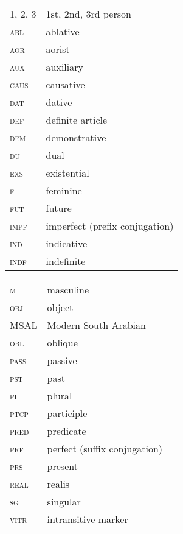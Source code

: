\documentclass[output=paper]{langsci/langscibook}
\begin{document}
\begin{tabularx}{.45\textwidth}{lQ}
\textsc{1, 2, 3} & 1st, 2nd, 3rd person \\
\textsc{abl} & ablative \\
\textsc{aor} & aorist \\
\textsc{aux} & auxiliary \\
\textsc{caus} & causative \\
\textsc{dat} & dative \\
\textsc{def} & definite article \\
\textsc{dem} & demonstrative \\
\textsc{du} & dual \\
\textsc{exs} & existential \\
\textsc{f} & feminine \\
\textsc{fut} & future \\
\textsc{impf} & imperfect (prefix conjugation) \\
\textsc{ind} & indicative \\
\textsc{indf} & indefinite \\
\end{tabularx}
\begin{tabularx}{.45\textwidth}{lQ}
\textsc{m} & masculine \\
\textsc{obj} & object \\
MSAL & Modern South Arabian \\
\textsc{obl} & oblique \\
\textsc{pass} & passive \\
\textsc{pst} & past \\
\textsc{pl} & plural \\
\textsc{ptcp} & participle \\
\textsc{pred} & predicate \\
\textsc{prf} & perfect (suffix conjugation) \\
\textsc{prs} & present \\
\textsc{real} & realis \\
\textsc{sg} & singular \\
\textsc{vitr} & intransitive marker \\
\end{tabularx}



\sloppy
\printbibliography[heading=subbibliography,notkeyword=this]
\end{document}
